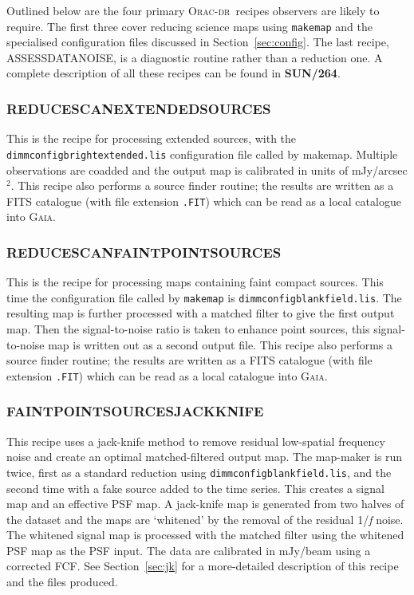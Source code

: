 \documentclass[twoside,11pt]{article}
\newcommand{\htmladdnormallink}[2]{#1}
\newcommand{\htmlref}[2]{#1}
\newcommand{\latexhtml}[2]{#1}
\newcommand{\xref}[3]{#1}
\newcommand{\xlabel}[1]{}
\renewcommand{\_}{\texttt{\symbol{95}}}
\newcommand{\gaia}{\xref{\textsc{Gaia}}{sun214}{}}
\newcommand{\oracdr}{\htmladdnormallink{\textsc{Orac-dr}}{http://www.oracdr.org/oracdr}}
\newcommand{\task}[1]{\textsf{#1}}
\newcommand{\makemap}{\xref{\task{makemap}}{sun258}{MAKEMAP}}
\newcommand{\pipelinesun}{\xref{\textbf{SUN/264}}{sun264}{}}
\newcommand{\cref}[3]{\latexhtml{#1~\ref{#2}}{\htmlref{#3}{#2}}}
\begin{document}
Outlined below are the four primary \oracdr\ recipes observers are
likely to require.  The first three cover reducing science maps using
\texttt{makemap} and the specialised configuration files discussed in
\cref{Section}{sec:config}{Specialised configuration files}. The last
recipe, ASSESS\_DATA\_NOISE, is a diagnostic routine rather than a
reduction one. A complete description of all these recipes can be
found in \pipelinesun.


\subsubsection{\xlabel{extsources}REDUCE\_SCAN\_EXTENDED\_SOURCES}

This is the recipe for processing extended sources, with the
\texttt{dimmconfig\_bright\_extended.lis} configuration file called by
\makemap. Multiple observations are coadded and the output
map is calibrated in units of mJy/arcsec$^2$. This recipe also
performs a source finder routine; the results are written as a FITS
catalogue (with file extension \texttt{.FIT}) which can be read as a
local catalogue into \gaia.

\subsubsection{\xlabel{faint}REDUCE\_SCAN\_FAINT\_POINT\_SOURCES}

This is the recipe for processing maps containing faint compact
sources. This time the configuration file called by \texttt{makemap}
is \texttt{dimmconfig\_blank\_field.lis}. The resulting map is further
processed with a matched filter to give the first output map. Then the
signal-to-noise ratio is taken to enhance point sources, this
signal-to-noise map is written out as a second output file. This
recipe also performs a source finder routine; the results are written
as a FITS catalogue (with file extension \texttt{.FIT}) which can be
read as a local catalogue into \gaia.

\subsubsection{\xlabel{faintjk}FAINT\_POINT\_SOURCES\_JACKKNIFE}

This recipe uses a jack-knife method to remove residual low-spatial
frequency noise and create an optimal matched-filtered output map. The
map-maker is run twice, first as a standard reduction using
\texttt{dimmconfig\_blank\_field.lis}, and the second time with a fake
source added to the time series. This creates a signal map and an
effective PSF map. A jack-knife map is generated from two halves of
the dataset and the maps are `whitened' by the removal of the residual
1/\emph{f} noise. The whitened signal map is processed with the
matched filter using the whitened PSF map as the PSF input. The data
are calibrated in mJy/beam using a corrected FCF. See
\cref{Section}{sec:jk}{Example 2 - Advanced pipeline method} for a 
more-detailed description of this recipe and the files produced.
\end{document}
